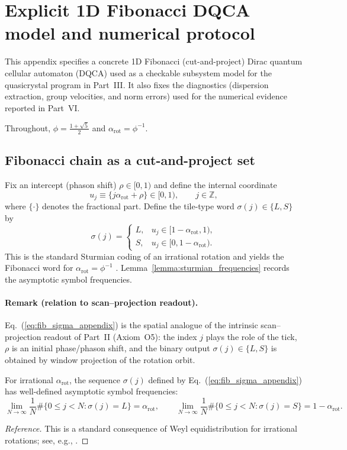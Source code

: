 \section{Explicit 1D Fibonacci DQCA model and numerical protocol}
\label{app:fib_dqca}

This appendix specifies a concrete 1D Fibonacci (cut-and-project) Dirac quantum cellular automaton (DQCA) used as a checkable subsystem model for the quasicrystal program in Part~III. It also fixes the diagnostics (dispersion extraction, group velocities, and norm errors) used for the numerical evidence reported in Part~VI.\par
Throughout, $\phi=\tfrac{1+\sqrt5}{2}$ and $\alpha_{\mathrm{rot}}=\phi^{-1}$.

\subsection{Fibonacci chain as a cut-and-project set}
Fix an intercept (phason shift) $\rho\in[0,1)$ and define the internal coordinate
\begin{equation}
    u_j \equiv \{j\alpha_{\mathrm{rot}}+\rho\}\in[0,1),\qquad j\in\mathbb{Z},
\end{equation}
where $\{\cdot\}$ denotes the fractional part. Define the tile-type word $\sigma(j)\in\{L,S\}$ by
\begin{equation}
    \sigma(j)=
    \begin{cases}
    L,& u_j\in[1-\alpha_{\mathrm{rot}},1),\\
    S,& u_j\in[0,1-\alpha_{\mathrm{rot}}).
    \end{cases}
\label{eq:fib_sigma_appendix}
\end{equation}
This is the standard Sturmian coding of an irrational rotation and yields the Fibonacci word for $\alpha_{\mathrm{rot}}=\phi^{-1}$ \cite{MorseHedlund1940,Lothaire2002}. Lemma~\ref{lemma:sturmian_frequencies} records the asymptotic symbol frequencies.
\paragraph{Remark (relation to scan--projection readout).}
Eq.~(\ref{eq:fib_sigma_appendix}) is the spatial analogue of the intrinsic scan--projection readout of Part~II (Axiom~O5): the index $j$ plays the role of the tick, $\rho$ is an initial phase/phason shift, and the binary output $\sigma(j)\in\{L,S\}$ is obtained by window projection of the rotation orbit.
\begin{lemma}
\label{lemma:sturmian_frequencies}
For irrational $\alpha_{\mathrm{rot}}$, the sequence $\sigma(j)$ defined by Eq.~(\ref{eq:fib_sigma_appendix}) has well-defined asymptotic symbol frequencies:
\begin{equation}
    \lim_{N\to\infty}\frac{1}{N}\#\{0\le j<N:\sigma(j)=L\}=\alpha_{\mathrm{rot}},\qquad
    \lim_{N\to\infty}\frac{1}{N}\#\{0\le j<N:\sigma(j)=S\}=1-\alpha_{\mathrm{rot}}.
\end{equation}
\end{lemma}
\begin{proof}[Reference]
This is a standard consequence of Weyl equidistribution for irrational rotations; see, e.g., \cite{Weyl1916,KuipersNiederreiter1974}.
\end{proof}
